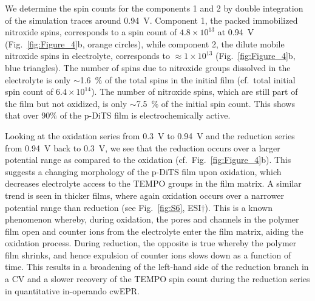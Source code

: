 \par
We determine the spin counts for the components 1 and 2 by double integration of the simulation traces around 0.94~V. Component 1, the packed immobilized nitroxide spins, corresponds to a spin count of $4.8\times10^{13}$ at 0.94~V (Fig.~\ref{fig:Figure_4}b, orange circles), while component 2, the dilute mobile nitroxide spins in electrolyte, corresponds to $\approx 1\times10^{13}$ (Fig.~\ref{fig:Figure_4}b, blue triangles). The number of spins due to nitroxide groups dissolved in the electrolyte is only $\sim$1.6~\% of the total spins in the initial film (cf.\ total initial spin count of $6.4\times10^{14}$). The number of nitroxide spins, which are still part of the film but not oxidized, is only $\sim$7.5~\% of the initial spin count. This shows that over 90\% of the p-DiTS film is electrochemically active.

\par
Looking at the oxidation series from 0.3~V to 0.94~V and the reduction series from 0.94~V back to 0.3~V, we see that the reduction occurs over a larger potential range as compared to the oxidation (cf.\ Fig.~\ref{fig:Figure_4}b). This suggests a changing morphology of the p-DiTS film upon oxidation, which decreases electrolyte access to the TEMPO groups in the film matrix. A similar trend is seen in thicker films, where again oxidation occurs over a narrower potential range than reduction (see Fig.~\ref{fig:S6}, ESI$\dag$). This is a known phenomenon whereby, during oxidation, the pores and channels in the polymer film open and counter ions from the electrolyte enter the film matrix, aiding the oxidation process. During reduction, the opposite is true whereby the polymer film shrinks, and hence expulsion of counter ions slows down as a function of time. This results in a broadening of the left-hand side of the reduction branch in a CV and a slower recovery of the TEMPO spin count during the reduction series in quantitative in-operando cwEPR. 

